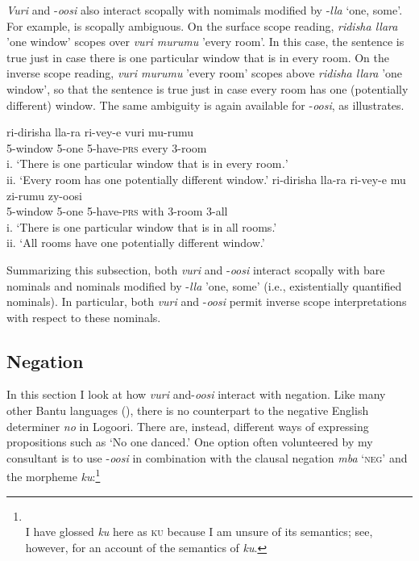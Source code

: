 \documentclass[output=paper]{langsci/langscibook}
\begin{document}
\textit{Vuri} and -\textit{oosi} also interact scopally with nomimals modified by -\textit{lla} ‘one, some’. For example,  is scopally ambiguous. On the surface scope reading, \textit{ridisha llara} 'one window' scopes over \textit{vuri murumu} 'every room'. In this case, the sentence is true just in case there is one particular window that is in every room. On the inverse scope reading, \textit{vuri murumu} 'every room' scopes above \textit{ridisha llara} 'one window', so that the sentence is true just in case every room has one (potentially different) window. The same ambiguity is again available for -\textit{oosi}, as  illustrates.

\ea\label{ex:landman:27} 
\ea\label{ex:landman:27a}
\gll ri-dirisha     lla-ra  ri-vey-e  vuri  mu-rumu  \\
     5-window   5-one  5-have-\textsc{prs}  every  3-room\\
\glt i. ‘There is one particular window that is in every room\textit{.}’  \\
ii. ‘Every room has one potentially different window.’        
\ex\label{ex:landman:27b}
\gll ri-dirisha   lla-ra   ri-vey-e         mu     zi-rumu  zy-oosi\\
     5-window  5-one   5-have-\textsc{prs}    with   3-room  3-all\\
\glt i. ‘There is one particular window that is in all rooms.’ \\
ii. ‘All rooms have one potentially different window.’    \textsc{}  
\z
\z

Summarizing this subsection, both \textit{vuri} and -\textit{oosi} interact scopally with bare nominals and nominals modified by -\textit{lla} 'one, some' (i.e., existentially quantified nominals). In particular, both \textit{vuri} and -\textit{oosi} permit inverse scope interpretations with respect to these nominals.

\subsection{Negation}\label{sec:landman:4.2}

In this section I look at how \textit{vuri} and-\textit{oosi} interact with negation. Like many other Bantu languages (\citealt{ZerbianKrifka2008}), there is no counterpart to the negative English determiner \textit{no} in Logoori. There are, instead, different ways of expressing propositions such as ‘No one danced.’ One option often volunteered by my consultant is to use -\textit{oosi} in combination with the clausal negation \textit{mba} ‘\textsc{neg}’ and the morpheme \textit{ku}:\footnote{\\
 I have glossed \textit{ku} here as \textsc{ku} because I am unsure of its semantics; see, however, \citet{BowlerGluckman2015} for an account of the semantics of \textit{ku}.}
\end{document}
